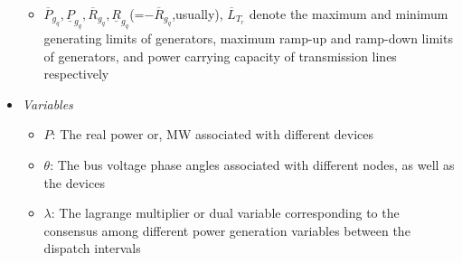 \documentclass[preprint,12pt,3p]{elsarticle}
\begin{document}
\begin{itemize}
\begin{itemize}[label={}]
        \item $\overline{P}_{g_q},\underline{P}_{g_q}, \overline{R}_{g_q},\underline{R}_{g_q}$(=$-\overline{R}_{g_q}$,usually), $\overline{L}_{T_r}$ denote the maximum and minimum generating limits of generators, maximum ramp-up and ramp-down limits of generators, and power carrying capacity of transmission lines respectively
    \end{itemize}
    \item \textit{Variables}
    \begin{itemize}[label={}]
        \item $P$: The real power or, MW associated with different devices
        \item $\theta$: The bus voltage phase angles associated with different nodes, as well as the devices
        \item $\lambda$: The lagrange multiplier or dual variable corresponding to the consensus among different power generation variables between the dispatch intervals
    \end{itemize}
\end{itemize}
\end{document}
